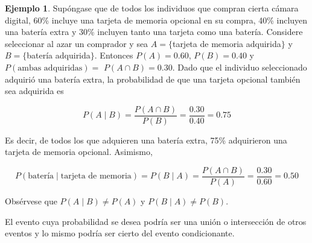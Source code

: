 \documentclass[
  11pt,
]{book}
\theoremstyle{definition}
\theoremstyle{definition}
\newtheorem{example}{Ejemplo}[chapter]
\theoremstyle{definition}
\theoremstyle{definition}
\theoremstyle{remark}
\begin{document}
\begin{example}
Supóngase que de todos los individuos que compran cierta cámara digital, 60\% incluye una tarjeta de memoria opcional en su compra, 40\% incluyen una batería extra y 30\% incluyen tanto una tarjeta como una batería. Considere seleccionar al azar un comprador y sea \(A =\lbrace\)tarjeta de memoria adquirida\(\rbrace\) y \(B =\lbrace\)batería adquirida\(\rbrace\). Entonces \(P(A) = 0.60\), \(P(B) = 0.40\) y \(P(\text{ambas adquiridas}) =\) \(P(A \cap B) = 0.30\). Dado que el individuo seleccionado adquirió una batería extra, la probabilidad de que una tarjeta opcional también sea adquirida es

\[
P(A \mid B) = \frac{P(A \cap B)}{P(B)} = \frac{0.30}{0.40} = 0.75
\]

Es decir, de todos los que adquieren una batería extra, 75\% adquirieron una tarjeta de memoria opcional. Asimismo,

\[
P(\text{batería} \mid \text{tarjeta de memoria}) = P(B \mid A) = \frac{P(A \cap B)}{P(A)} = \frac{0.30}{0.60} = 0.50
\]

Obsérvese que \(P(A \mid B) \neq P(A)\) y \(P(B \mid A) \neq P(B)\).

El evento cuya probabilidad se desea podría ser una unión o intersección de otros eventos y lo mismo podría ser cierto del evento condicionante.
\end{example}
\end{document}
